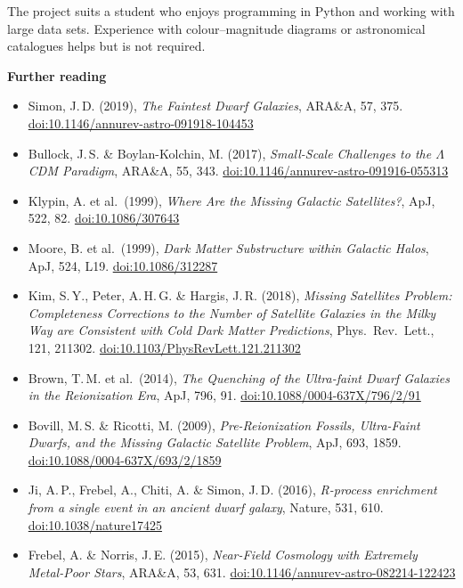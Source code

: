 \documentclass[11pt,a4paper]{article}
\begin{document}
The project suits a student who enjoys programming in Python and working with large data sets. Experience with colour--magnitude diagrams or astronomical catalogues helps but is not required.

\vspace{0.5em}
{\small\raggedright
\textbf{Further reading}
\begin{itemize}[leftmargin=1.2em,itemsep=0.1em,parsep=0pt,topsep=0.3em]
\item Simon, J.\,D. (2019), \emph{The Faintest Dwarf Galaxies}, ARA\&A, 57, 375. \href{https://doi.org/10.1146/annurev-astro-091918-104453}{doi:10.1146/annurev-astro-091918-104453}
\item Bullock, J.\,S. \& Boylan-Kolchin, M. (2017), \emph{Small-Scale Challenges to the $\Lambda$CDM Paradigm}, ARA\&A, 55, 343. \href{https://doi.org/10.1146/annurev-astro-091916-055313}{doi:10.1146/annurev-astro-091916-055313}
\item Klypin, A. et al.\ (1999), \emph{Where Are the Missing Galactic Satellites?}, ApJ, 522, 82. \href{https://doi.org/10.1086/307643}{doi:10.1086/307643}
\item Moore, B. et al.\ (1999), \emph{Dark Matter Substructure within Galactic Halos}, ApJ, 524, L19. \href{https://doi.org/10.1086/312287}{doi:10.1086/312287}
\item Kim, S.\,Y., Peter, A.\,H.\,G. \& Hargis, J.\,R. (2018), \emph{Missing Satellites Problem: Completeness Corrections to the Number of Satellite Galaxies in the Milky Way are Consistent with Cold Dark Matter Predictions}, Phys.\ Rev.\ Lett., 121, 211302. \href{https://doi.org/10.1103/PhysRevLett.121.211302}{doi:10.1103/PhysRevLett.121.211302}
\item Brown, T.\,M. et al.\ (2014), \emph{The Quenching of the Ultra-faint Dwarf Galaxies in the Reionization Era}, ApJ, 796, 91. \href{https://doi.org/10.1088/0004-637X/796/2/91}{doi:10.1088/0004-637X/796/2/91}
\item Bovill, M.\,S. \& Ricotti, M. (2009), \emph{Pre-Reionization Fossils, Ultra-Faint Dwarfs, and the Missing Galactic Satellite Problem}, ApJ, 693, 1859. \href{https://doi.org/10.1088/0004-637X/693/2/1859}{doi:10.1088/0004-637X/693/2/1859}
\item Ji, A.\,P., Frebel, A., Chiti, A. \& Simon, J.\,D. (2016), \emph{R-process enrichment from a single event in an ancient dwarf galaxy}, Nature, 531, 610. \href{https://doi.org/10.1038/nature17425}{doi:10.1038/nature17425}
\item Frebel, A. \& Norris, J.\,E. (2015), \emph{Near-Field Cosmology with Extremely Metal-Poor Stars}, ARA\&A, 53, 631. \href{https://doi.org/10.1146/annurev-astro-082214-122423}{doi:10.1146/annurev-astro-082214-122423}

\end{itemize}}
\end{document}
